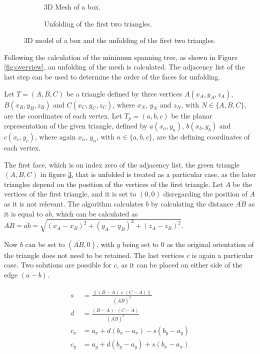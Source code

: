 \documentclass[draft,final]{vutinfth} %
\begin{document}
\begin{figure}
\centering
\begin{subfigure}[t]{.4\textwidth}
	
  \caption{3D Mesh of a box.}
	\label{fig:unfold3d}
\end{subfigure}%
\hspace{.1\textwidth}
\begin{subfigure}[t]{.4\textwidth}
	
	\caption{Unfolding of the first two triangles.}
	\label{fig:unfold2d}
\end{subfigure}
\caption{3D model of a box and the unfolding of the first two triangles.}
\label{fig:unfoldexample}
\end{figure}

Following the calculation of the minimum spanning tree, as shown in Figure \ref{fig:overview}, an unfolding of the mesh is calculated. The adjacency list of the last step can be used to determine the order of the faces for unfolding.

Let $T = (A,B,C)$ be a triangle defined by three vertices $A(x_A, y_A, z_A)$, $B(x_B, y_B, z_B)$ and $C(x_C, y_C, z_C)$, where $x_N$, $y_N$ and $z_N$, with $N \in \{A,B,C\}$, are the coordinates of each vertex. Let $T_p = (a, b, c)$ be the planar representation of the given triangle, defined by $a(x_a, y_a)$, $b(x_b, y_b)$ and $c(x_c, y_c)$, where again $x_n$, $y_n$, with $n \in \{a,b,c\}$, are the defining coordinates of each vertex.

The first face, which is on index zero of the adjacency list, the green triangle $(A,B,C)$ in figure \ref{fig:unfoldexample}, that is unfolded is treated as a particular case, as the later triangles depend on the position of the vertices of the first triangle. Let $A$ be the vertices of the first triangle, and it is set to $(0,0)$ disregarding the position of $A$ as it is not relevant. The algorithm calculates $b$ by calculating the distance $\overline{AB}$ as it is equal to $\overline{ab}$, which can be calculated as $\overline{AB} = \overline{ab} = \sqrt{(x_A - x_B)^2 + (y_A - y_B)^2 + (z_A - z_B)^2}$.

Now $b$ can be set to $(\overline{AB}, 0)$, with $y$ being set to $0$ as the original orientation of the triangle does not need to be retained. The last vertices $c$ is again a particular case. Two solutions are possible for $c$, as it can be placed on either side of the edge $(a-b)$. 

\begin{align}
\label{eq:cone}
\begin{split}
s &= \frac{\|(B - A)\times(C - A)\|}{(\overline{AB})^2}\\
d &= \frac{(B-A)\cdot(C-A)}{(\overline{AB})^2}\\
c_x &= a_x + d(b_x - a_x) - s(b_y - a_y)\\
c_y &= a_y + d(b_y - a_y) + s(b_x - a_x)
\end{split}
\end{align}
\end{document}
